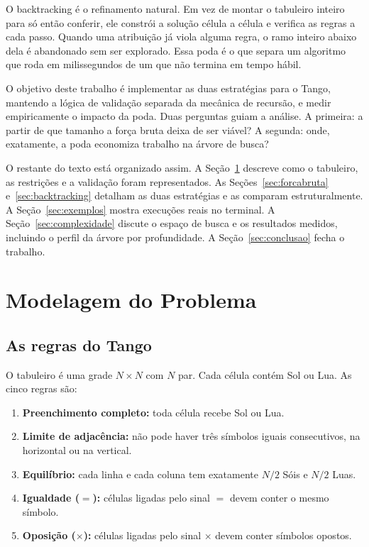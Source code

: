 \documentclass[12pt]{article}
\begin{document}
O backtracking é o refinamento natural. Em vez de montar o tabuleiro inteiro para só então conferir, ele constrói a solução célula a célula e verifica as regras a cada passo. Quando uma atribuição já viola alguma regra, o ramo inteiro abaixo dela é abandonado sem ser explorado. Essa poda é o que separa um algoritmo que roda em milissegundos de um que não termina em tempo hábil.

O objetivo deste trabalho é implementar as duas estratégias para o Tango, mantendo a lógica de validação separada da mecânica de recursão, e medir empiricamente o impacto da poda. Duas perguntas guiam a análise. A primeira: a partir de que tamanho a força bruta deixa de ser viável? A segunda: onde, exatamente, a poda economiza trabalho na árvore de busca?

O restante do texto está organizado assim. A Seção~\ref{sec:modelagem} descreve como o tabuleiro, as restrições e a validação foram representados. As Seções~\ref{sec:forcabruta} e~\ref{sec:backtracking} detalham as duas estratégias e as comparam estruturalmente. A Seção~\ref{sec:exemplos} mostra execuções reais no terminal. A Seção~\ref{sec:complexidade} discute o espaço de busca e os resultados medidos, incluindo o perfil da árvore por profundidade. A Seção~\ref{sec:conclusao} fecha o trabalho.

\section{Modelagem do Problema}
\label{sec:modelagem}

\subsection{As regras do Tango}

O tabuleiro é uma grade $N \times N$ com $N$ par. Cada célula contém Sol ou Lua. As cinco regras são:

\begin{enumerate}
  \item \textbf{Preenchimento completo:} toda célula recebe Sol ou Lua.
  \item \textbf{Limite de adjacência:} não pode haver três símbolos iguais consecutivos, na horizontal ou na vertical.
  \item \textbf{Equilíbrio:} cada linha e cada coluna tem exatamente $N/2$ Sóis e $N/2$ Luas.
  \item \textbf{Igualdade ($=$):} células ligadas pelo sinal $=$ devem conter o mesmo símbolo.
  \item \textbf{Oposição ($\times$):} células ligadas pelo sinal $\times$ devem conter símbolos opostos.
\end{enumerate}
\end{document}
